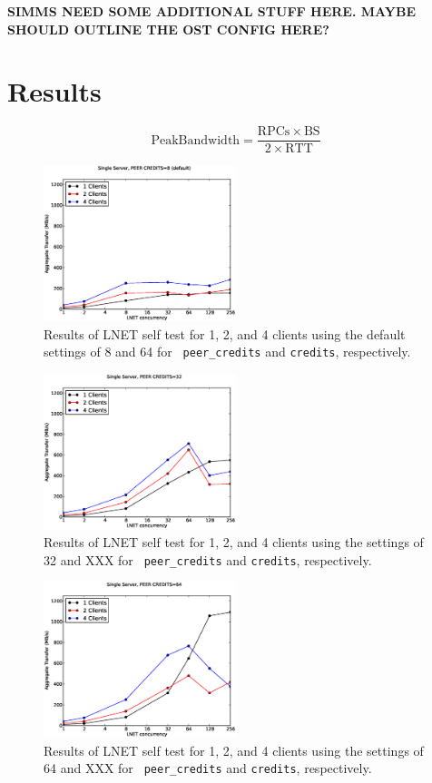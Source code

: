 \documentclass[]{sigplan-proc}
\begin{document}
{\bf SIMMS NEED SOME ADDITIONAL STUFF HERE. MAYBE SHOULD OUTLINE THE OST CONFIG HERE?}

\section{Results}\label{sec:results}
\begin{equation}
\mathrm{Peak Bandwidth = \frac{RPCs \times BS}{2 \times RTT}}
\label{eq:band}
\end{equation}

\begin{figure}
\centering
\includegraphics[width=0.50\textwidth]{figures/default_pc_plot.eps}
\caption{Results of LNET self test for 1, 2, and 4 clients using the default settings of 8 and 64 for {\tt
    peer\_credits} and {\tt credits}, respectively.}
\label{fig:default}
\end{figure}

\begin{figure}
\centering
\includegraphics[width=0.50\textwidth]{figures/32pc_plot.eps}
\caption{Results of LNET self test for 1, 2, and 4 clients using the settings of 32 and XXX for {\tt
    peer\_credits} and {\tt credits}, respectively.}
\label{fig:32pc}
\end{figure}

\begin{figure}
\centering
\includegraphics[width=0.50\textwidth]{figures/64pc_plot.eps}
\caption{Results of LNET self test for 1, 2, and 4 clients using the settings of 64 and XXX for {\tt
    peer\_credits} and {\tt credits}, respectively.}
\label{fig:64pc}
\end{figure}
\end{document}
